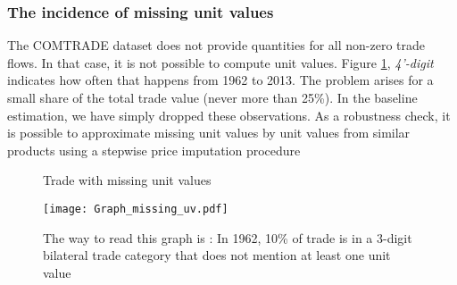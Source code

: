 \documentclass[12pt,twoside,a4paper,notitlepage]{article}
\begin{document}
\subsubsection{ The incidence of missing unit values}

The COMTRADE dataset does not provide quantities for all non-zero trade flows. In that case, it is not possible to compute unit values.
Figure \ref{fig:missing_uv}, \textit{4'-digit} indicates how often that happens from 1962 to 2013.
The problem arises for a small share of the total trade value (never more than 25\%).
In the baseline estimation, we have simply dropped these observations. As a robustness check, it is possible to approximate missing unit values by unit values from similar products using a stepwise price imputation procedure


\begin{figure}
	\caption{Trade with missing unit values}
	\texttt{[image: Graph\_missing\_uv.pdf]}
	\label{fig:missing_uv}
	\caption*{The way to read this graph is : In 1962, 10\% of trade is in a 3-digit bilateral trade category that does not mention at least one unit value}
\end{figure}




\end{document}
